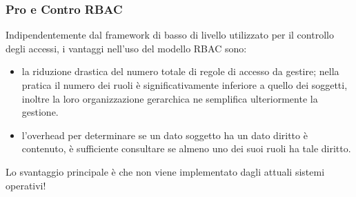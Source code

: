 \subsubsection{Pro e Contro RBAC}
Indipendentemente dal framework di basso di livello utilizzato per il controllo degli accessi, i vantaggi nell’uso del modello RBAC sono:
\begin{itemize} 
  \item la riduzione drastica del numero totale di regole di accesso da gestire; nella pratica il numero dei ruoli è significativamente inferiore a quello dei soggetti, inoltre la loro organizzazione gerarchica ne semplifica ulteriormente la gestione.
  \item l'overhead per determinare se un dato soggetto ha un dato diritto è contenuto, è sufficiente consultare se almeno uno dei suoi ruoli ha tale diritto.
\end{itemize}
Lo svantaggio principale è che non viene implementato dagli attuali sistemi operativi!
